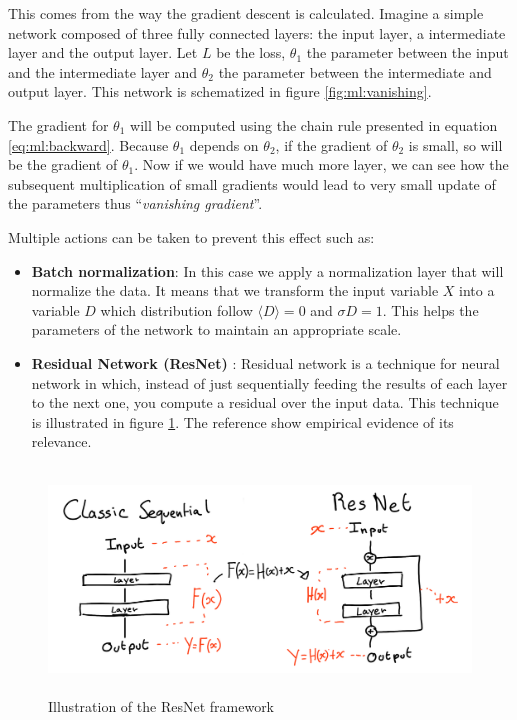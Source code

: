 \documentclass[../main.tex]{subfiles}
\begin{document}
This comes from the way the gradient descent is calculated. Imagine a simple network composed of three fully connected layers: the input layer, a intermediate layer and the output layer. Let $L$ be the loss, $\theta_1$ the parameter between the input and the intermediate layer and $\theta_2$ the parameter between the intermediate and output layer. This network is schematized in figure \ref{fig:ml:vanishing}.

The gradient for $\theta_1$ will be computed using the chain rule presented in equation \ref{eq:ml:backward}. Because $\theta_1$ depends on $\theta_2$, if the gradient of $\theta_2$ is small, so will be the gradient of $\theta_1$. Now if we would have much more layer, we can see how the subsequent multiplication of small gradients would lead to very small update of the parameters thus ``\textit{vanishing gradient}''.

Multiple actions can be taken to prevent this effect such as:
\begin{itemize}
  \item \textbf{Batch normalization}: In this case we apply a normalization layer that will normalize the data. It means that we transform the input variable $X$ into a variable $D$ which distribution follow $\langle D \rangle = 0$ and $\sigma D = 1$. This helps the parameters of the network to maintain an appropriate scale.
  \item \textbf{Residual Network (ResNet)} \cite{he_deep_2016}: Residual network is a technique for neural network in which, instead of just sequentially feeding the results of each layer to the next one, you compute a residual over the input data. This technique is illustrated in figure \ref{fig:ml:resnet}. The reference \cite{he_deep_2016} show empirical evidence of its relevance.
\end{itemize}


\begin{figure}[ht]
  \centering
  \includegraphics[height=6cm]{images/ml/resnet.png}
  \caption{Illustration of the ResNet framework}
  \label{fig:ml:resnet}
\end{figure}
\end{document}
